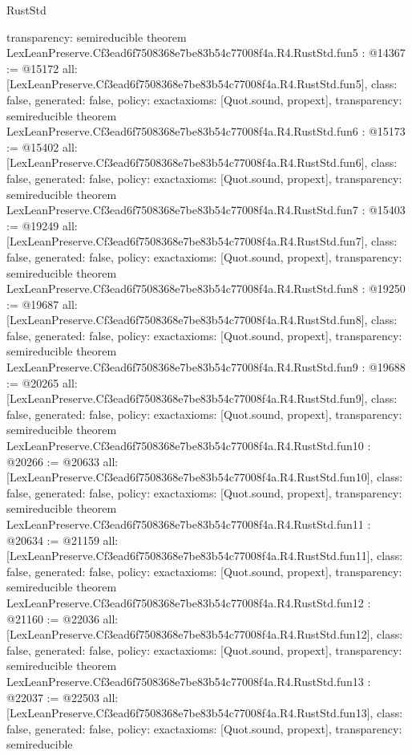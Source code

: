 \begin{lexlean}{RustStd}
\begin{coremodule}
{  transparency: semireducible
}
theorem LexLeanPreserve.Cf3ead6f7508368e7be83b54c77008f4a.R4.RustStd.fun5 : @14367 := @15172 {
  all: [LexLeanPreserve.Cf3ead6f7508368e7be83b54c77008f4a.R4.RustStd.fun5],
  class: false,
  generated: false,
  policy: exact{axioms: [Quot.sound, propext]},
  transparency: semireducible
}
theorem LexLeanPreserve.Cf3ead6f7508368e7be83b54c77008f4a.R4.RustStd.fun6 : @15173 := @15402 {
  all: [LexLeanPreserve.Cf3ead6f7508368e7be83b54c77008f4a.R4.RustStd.fun6],
  class: false,
  generated: false,
  policy: exact{axioms: [Quot.sound, propext]},
  transparency: semireducible
}
theorem LexLeanPreserve.Cf3ead6f7508368e7be83b54c77008f4a.R4.RustStd.fun7 : @15403 := @19249 {
  all: [LexLeanPreserve.Cf3ead6f7508368e7be83b54c77008f4a.R4.RustStd.fun7],
  class: false,
  generated: false,
  policy: exact{axioms: [Quot.sound, propext]},
  transparency: semireducible
}
theorem LexLeanPreserve.Cf3ead6f7508368e7be83b54c77008f4a.R4.RustStd.fun8 : @19250 := @19687 {
  all: [LexLeanPreserve.Cf3ead6f7508368e7be83b54c77008f4a.R4.RustStd.fun8],
  class: false,
  generated: false,
  policy: exact{axioms: [Quot.sound, propext]},
  transparency: semireducible
}
theorem LexLeanPreserve.Cf3ead6f7508368e7be83b54c77008f4a.R4.RustStd.fun9 : @19688 := @20265 {
  all: [LexLeanPreserve.Cf3ead6f7508368e7be83b54c77008f4a.R4.RustStd.fun9],
  class: false,
  generated: false,
  policy: exact{axioms: [Quot.sound, propext]},
  transparency: semireducible
}
theorem LexLeanPreserve.Cf3ead6f7508368e7be83b54c77008f4a.R4.RustStd.fun10 : @20266 := @20633 {
  all: [LexLeanPreserve.Cf3ead6f7508368e7be83b54c77008f4a.R4.RustStd.fun10],
  class: false,
  generated: false,
  policy: exact{axioms: [Quot.sound, propext]},
  transparency: semireducible
}
theorem LexLeanPreserve.Cf3ead6f7508368e7be83b54c77008f4a.R4.RustStd.fun11 : @20634 := @21159 {
  all: [LexLeanPreserve.Cf3ead6f7508368e7be83b54c77008f4a.R4.RustStd.fun11],
  class: false,
  generated: false,
  policy: exact{axioms: [Quot.sound, propext]},
  transparency: semireducible
}
theorem LexLeanPreserve.Cf3ead6f7508368e7be83b54c77008f4a.R4.RustStd.fun12 : @21160 := @22036 {
  all: [LexLeanPreserve.Cf3ead6f7508368e7be83b54c77008f4a.R4.RustStd.fun12],
  class: false,
  generated: false,
  policy: exact{axioms: [Quot.sound, propext]},
  transparency: semireducible
}
theorem LexLeanPreserve.Cf3ead6f7508368e7be83b54c77008f4a.R4.RustStd.fun13 : @22037 := @22503 {
  all: [LexLeanPreserve.Cf3ead6f7508368e7be83b54c77008f4a.R4.RustStd.fun13],
  class: false,
  generated: false,
  policy: exact{axioms: [Quot.sound, propext]},
  transparency: semireducible
}
\end{coremodule}
\end{lexlean}
